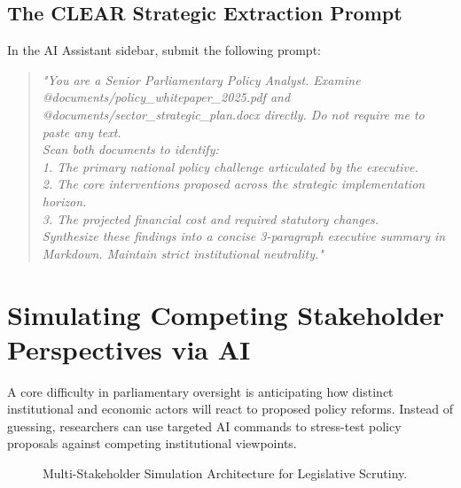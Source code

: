 \documentclass[11pt, a4paper]{report}
\begin{document}
\subsection{The CLEAR Strategic Extraction Prompt}
In the AI Assistant sidebar, submit the following prompt:
\begin{quote}
\small
\textit{"You are a Senior Parliamentary Policy Analyst. Examine @documents/policy\_whitepaper\_2025.pdf and @documents/sector\_strategic\_plan.docx directly. Do not require me to paste any text. \\
Scan both documents to identify: \\
1. The primary national policy challenge articulated by the executive. \\
2. The core interventions proposed across the strategic implementation horizon. \\
3. The projected financial cost and required statutory changes. \\
Synthesize these findings into a concise 3-paragraph executive summary in Markdown. Maintain strict institutional neutrality."}
\end{quote}

\section{Simulating Competing Stakeholder Perspectives via AI}
A core difficulty in parliamentary oversight is anticipating how distinct institutional and economic actors will react to proposed policy reforms. Instead of guessing, researchers can use targeted AI commands to stress-test policy proposals against competing institutional viewpoints.

\begin{figure}[htbp]
  \centering
  \caption{Multi-Stakeholder Simulation Architecture for Legislative Scrutiny.}
  \label{fig:stakeholder_simulation}
\end{figure}
\end{document}
